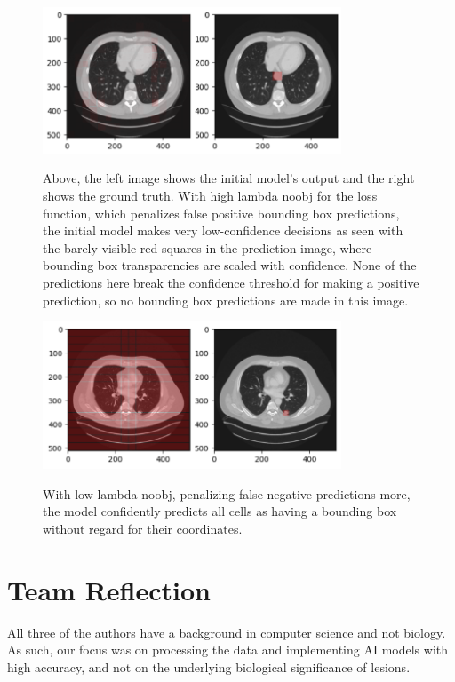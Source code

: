 \begin{figure}
 \begin{center}
 \includegraphics[width=3.5in]{images/low_boxes.png}\\
 \caption{Above, the left image shows the initial model's output and the right shows the ground truth. With high lambda noobj for the loss function, which penalizes false positive bounding box predictions, the initial model makes very low-confidence decisions as seen with the barely visible red squares in the prediction image, where bounding box transparencies are scaled with confidence. None of the predictions here break the confidence threshold for making a positive prediction, so no bounding box predictions are made in this image.}\label{low_boxes}
 \end{center}
\end{figure}

\begin{figure}
 \begin{center}
 \includegraphics[width=3.5in]{images/high_boxes.png}\\
 \caption{With low lambda noobj, penalizing false negative predictions more, the model confidently predicts all cells as having a bounding box without regard for their coordinates.}\label{high_boxes}
 \end{center}
\end{figure}


\section*{Team Reflection}
All three of the authors have a background in computer science and not biology. As such, our focus was on processing the data and implementing AI models with high accuracy, and not on the underlying biological significance of lesions.

